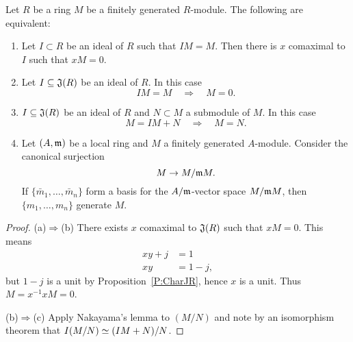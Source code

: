 \documentclass{ximera}
\begin{document}


\begin{theorem}
  Let $R$ be a ring $M$ be a finitely generated $R$-module. The
  following are equivalent:
  \begin{enumerate}
    \item Let $I\subset R$ be an ideal of $R$ such that $IM = M$. Then
      there is $x$ comaximal to $I$ such that $xM = 0$.
    \item Let $I\subseteq \mathfrak J(R)$ be an ideal of $R$. In this case
      \[
      IM = M \quad\Rightarrow\quad M = 0.
      \]
    \item $I\subseteq \mathfrak J(R)$ be an ideal of $R$ and $N\subset M$ a
      submodule of $M$. In this case
      \[
      M = IM + N \quad \Rightarrow \quad M = N.
      \]
    \item Let $(A,\mathfrak{m})$ be a local ring and $M$ a finitely generated
      $A$-module. Consider the canonical surjection
      \[
      M \to  M/\mathfrak{m} M.
      \]
      If $\{\bar{m}_1,\dots, \bar{m}_n\}$ form a basis for the $A/\mathfrak{m}$-vector
      space $M/\mathfrak{m} M$, then $\{m_1,\dots, m_n\}$ generate $M$.
  \end{enumerate}
  \begin{proof} 
    (a)$\Rightarrow$(b) There exists $x$ comaximal to $\mathfrak J(R)$ such
    that $xM = 0$. This means
    \begin{align*}
      xy + j &= 1\\
      xy &= 1-j,
    \end{align*}
    but $1-j$ is a unit by Proposition~\ref{P:CharJR}, hence $x$ is a
    unit. Thus $M = x^{-1}x M = 0$.

    
    (b)$\Rightarrow$(c) Apply Nakayama's lemma to $(M/N)$ and note by
    an isomorphism theorem that $I(M/N)\simeq (IM + N)/N$.


\end{proof}
\end{theorem}
\end{document}
